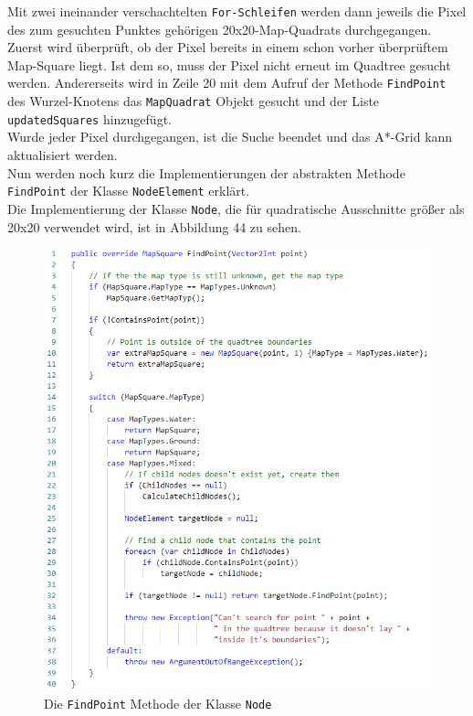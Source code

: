 \documentclass[a4paper,12pt]{article}
\newcommand{\code}{\texttt}
\begin{document}
Mit zwei ineinander verschachtelten \code{For-Schleifen} werden dann jeweils die Pixel des zum gesuchten Punktes gehörigen 20x20-Map-Quadrats durchgegangen.
\\[0.4cm]
Zuerst wird überprüft, ob der Pixel bereits in einem schon vorher überprüftem Map-Square liegt. Ist dem so, muss der Pixel nicht erneut im Quadtree gesucht werden. Andererseits wird in Zeile 20 mit dem Aufruf der Methode \code{FindPoint} des Wurzel-Knotens das \code{MapQuadrat} Objekt gesucht und der Liste \code{updatedSquares} hinzugefügt.
\\[0.4cm]
Wurde jeder Pixel durchgegangen, ist die Suche beendet und das A*-Grid kann aktualisiert werden.
\\[0.4cm]
Nun werden noch kurz die Implementierungen der abstrakten Methode \code{FindPoint} der Klasse \code{NodeElement} erklärt.
\\[0.4cm]
Die Implementierung der Klasse \code{Node}, die für quadratische Ausschnitte größer als 20x20 verwendet wird, ist in Abbildung 44 zu sehen.
\begin{figure}[H]
    \centering
    \includegraphics[width=1\linewidth]{Bilder/Aufgabe3/Quadtree_02.png}
    \caption{Die \code{FindPoint} Methode der Klasse \code{Node}}
\end{figure}
\end{document}
